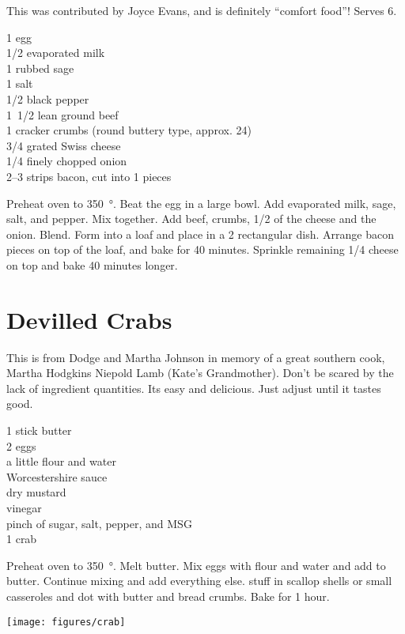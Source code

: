 \begin{open}
  This was contributed by Joyce Evans, and is definitely ``comfort
  food''! Serves 6.
\end{open}
\begin{ingredients}
  1 egg \\
  \SI{1/2}{\cup} evaporated milk \\
  \SI{1}{\teaspoon} rubbed sage \\
  \SI{1}{\teaspoon} salt \\
  \SI{1/2}{\teaspoon} black pepper \\
  \SI{1/2}[1]{\pound} lean ground beef \\
  \SI{1}{\cup} cracker crumbs (round buttery type, approx. 24) \\
  \SI{3/4}{\cup} grated Swiss cheese \\
  \SI{1/4}{\cup} finely chopped onion \\
  \numrange{2}{3} strips bacon, cut into \SI{1}{\inch} pieces
\end{ingredients}
Preheat oven to \SI{350}{\degree}. Beat the egg in a large bowl. Add evaporated milk,
sage, salt, and pepper.  Mix together. Add beef, crumbs, \SI{1/2}{\cup} of the
cheese and the onion. Blend. Form into a loaf and place in a \SI{2}{\quart}
rectangular dish.  Arrange bacon pieces on top of the loaf, and bake for
40 minutes. Sprinkle remaining \SI{1/4}{\cup} cheese on top and bake
40 minutes longer.

\section{Devilled Crabs}

\begin{open}
  This is from Dodge and Martha Johnson in memory of a great southern
  cook, Martha Hodgkins Niepold Lamb (Kate's Grandmother).  Don't be scared by
  the lack of ingredient quantities. Its easy and delicious.  Just adjust
  until it tastes good.
\end{open}
\begin{ingredients}
  1 stick butter\\
  2 eggs\\
  a little flour and water\\
  Worcestershire sauce\\
  dry mustard\\
  vinegar\\
  pinch of sugar, salt, pepper, and MSG\\
  \SI{1}{\pound} crab
\end{ingredients}
Preheat oven to \SI{350}{\degree}.  Melt butter. Mix eggs with flour and water and add
to butter. Continue mixing and add everything else. stuff in scallop shells or
small casseroles and dot with butter and bread crumbs. Bake for 1 hour.
\begin{center}
    \texttt{[image: figures/crab]}
\end{center}

